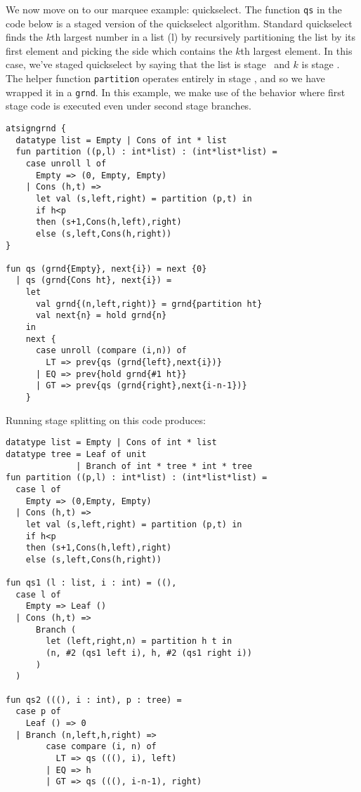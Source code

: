 We now move on to our marquee example: quickselect.
The function {\tt qs} in the code below is a staged version of the quickselect algorithm.
Standard quickselect finds the $k$th largest number in a list (l) by recursively partitioning the list by its 
first element and picking the side which contains the $k$th largest element.
In this case, we've staged quickselect by saying that the list is stage \bbone\ and $k$ is stage \bbtwo.
The helper function {\tt partition} operates entirely in stage \bbone, and so we have wrapped it in a \texttt{grnd}.
In this example, we make use of the behavior where first stage code is executed even under second stage branches.

\begin{lstlisting} 
atsigngrnd { 
  datatype list = Empty | Cons of int * list
  fun partition ((p,l) : int*list) : (int*list*list) = 
    case unroll l of 
      Empty => (0, Empty, Empty) 
    | Cons (h,t) => 
      let val (s,left,right) = partition (p,t) in 
      if h<p 
      then (s+1,Cons(h,left),right) 
      else (s,left,Cons(h,right))
}

fun qs (grnd{Empty}, next{i}) = next {0} 
  | qs (grnd{Cons ht}, next{i}) =
    let 
      val grnd{(n,left,right)} = grnd{partition ht}
      val next{n} = hold grnd{n}
    in
    next { 
      case unroll (compare (i,n)) of
        LT => prev{qs (grnd{left},next{i})}
      | EQ => prev{hold grnd{#1 ht}}
      | GT => prev{qs (grnd{right},next{i-n-1})}
    }
\end{lstlisting}
Running stage splitting on this code produces:
\begin{lstlisting} 
datatype list = Empty | Cons of int * list
datatype tree = Leaf of unit 
              | Branch of int * tree * int * tree
fun partition ((p,l) : int*list) : (int*list*list) = 
  case l of 
    Empty => (0,Empty, Empty) 
  | Cons (h,t) => 
    let val (s,left,right) = partition (p,t) in 
    if h<p 
    then (s+1,Cons(h,left),right) 
    else (s,left,Cons(h,right))

fun qs1 (l : list, i : int) = ((), 
  case l of
    Empty => Leaf ()
  | Cons (h,t) => 
      Branch (
        let (left,right,n) = partition h t in
        (n, #2 (qs1 left i), h, #2 (qs1 right i))
      )
  )

fun qs2 (((), i : int), p : tree) = 
  case p of
    Leaf () => 0
  | Branch (n,left,h,right) =>
        case compare (i, n) of 
          LT => qs (((), i), left) 
        | EQ => h 
        | GT => qs (((), i-n-1), right)

\end{lstlisting}

